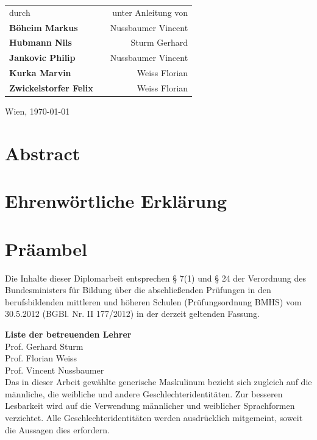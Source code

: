 \documentclass[
    headings=optiontotocandhead,%
    twoside,
    numbers=noenddot,%
    toc=flat, %
    12pt, %
    titlepage, %
    parskip=full, %
    listof=totoc, %
    listof=flat, %
    numbers=noenddot, %
    bibliography=totoc, %
    a4paper,DIV=14,
    BCOR=15mm,
]{scrbook}
\begin{document}
\begin{titlepage}
\begin{center}
{
\renewcommand{\arraystretch}{1.8}
\begin{tabular}{l c r}
durch  & \hfill & unter Anleitung von \\
\textbf{\large{}Böheim Markus} && Nussbaumer Vincent \\
\textbf{\large{}Hubmann Nils} && Sturm Gerhard \\
\textbf{\large{}Jankovic Philip} && Nussbaumer Vincent \\
\textbf{\large{}Kurka Marvin} && Weiss Florian \\
\textbf{\large{}Zwickelstorfer Felix} && Weiss Florian \\
\end{tabular}
}

\vfill

Wien, \today
\par\end{center}

\end{titlepage}



\chapter*{Abstract}


\chapter*{Ehrenwörtliche Erklärung}


\chapter*{Präambel}
Die Inhalte dieser Diplomarbeit entsprechen § 7(1) und § 24 der Verordnung des Bundesministers für Bildung über die abschließenden Prüfungen in den berufsbildenden mittleren und höheren Schulen (Prüfungsordnung BMHS) vom 30.5.2012 (BGBl. Nr. II 177/2012) in der derzeit geltenden Fassung.

\textbf{Liste der betreuenden Lehrer} \\
Prof. Gerhard Sturm \\ %
Prof. Florian Weiss \\
Prof. Vincent Nussbaumer \\

Das in dieser Arbeit gewählte generische Maskulinum bezieht sich zugleich auf die männliche, die weibliche und andere
Geschlechteridentitäten. Zur besseren Lesbarkeit wird auf die Verwendung männlicher und weiblicher Sprachformen verzichtet.
Alle Geschlechteridentitäten werden ausdrücklich mitgemeint, soweit die Aussagen dies erfordern.
\end{document}
